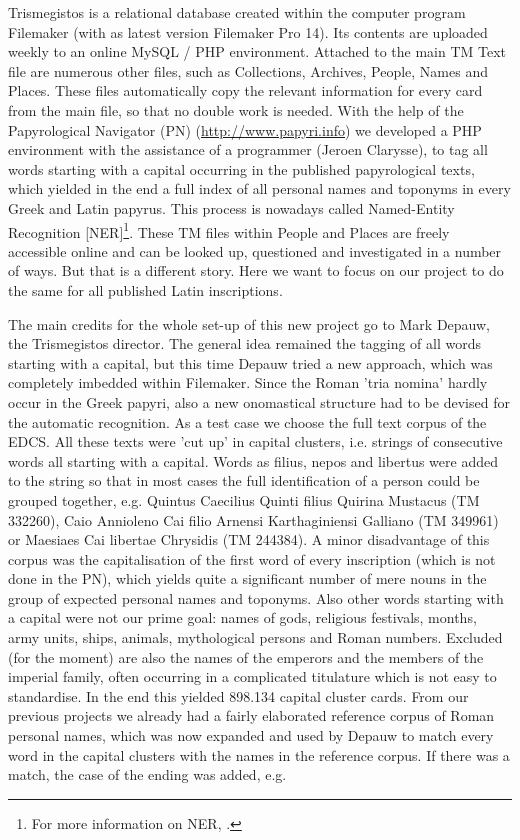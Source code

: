 \documentclass[amsthm,ebook]{saparticle}
\begin{document}
 Trismegistos is a relational database created within the computer program Filemaker (with as latest version
Filemaker Pro 14). Its contents are uploaded weekly to an online MySQL / PHP environment. Attached to the main TM Text
file are numerous other files, such as Collections, Archives, People, Names and Places. These files automatically copy
the relevant information for every card from the main file, so that no double work is needed. With the help of the
Papyrological Navigator (PN) (\url{http://www.papyri.info}) we developed a PHP environment with the assistance of a
programmer (Jeroen Clarysse), to tag all words starting with a capital occurring in the published papyrological texts,
which yielded in the end a full index of all personal names and toponyms in every Greek and Latin papyrus. This process
is nowadays called Named-Entity Recognition [NER]\footnote{ For more information on NER, \citet[304-313]{BrouxDepauw}.}. These
TM files within People and Places are freely accessible online and can be looked up, questioned and investigated in a
number of ways. But that is a different story. Here we want to focus on our project to do the same for all published
Latin inscriptions.


 The main credits for the whole set-up of this new project go to Mark Depauw, the Trismegistos director. The general
idea remained the tagging of all words starting with a capital, but this time Depauw tried a new approach, which was
completely imbedded within Filemaker. Since the Roman 'tria nomina' hardly occur in the Greek papyri, also a new
onomastical structure had to be devised for the automatic recognition. As a test case we choose the full text corpus of
the EDCS. All these texts were 'cut up' in capital clusters, i.e. strings of consecutive words all starting with a
capital. Words as filius, nepos and libertus were added to the string so that in most cases the full identification of
a person could be grouped together, e.g. Quintus Caecilius Quinti filius Quirina Mustacus (TM 332260), Caio Annioleno
Cai filio Arnensi Karthaginiensi Galliano (TM 349961) or Maesiaes Cai libertae Chrysidis (TM 244384). A minor
disadvantage of this corpus was the capitalisation of the first word of every inscription (which is not done in the
PN), which yields quite a significant number of mere nouns in the group of expected personal names and toponyms. Also
other words starting with a capital were not our prime goal: names of gods, religious festivals, months, army units,
ships, animals, mythological persons and Roman numbers. Excluded (for the moment) are also the names of the emperors
and the members of the imperial family, often occurring in a complicated titulature which is not easy to standardise.
In the end this yielded 898.134 capital cluster cards. From our previous projects we already had a fairly elaborated
reference corpus of Roman personal names, which was now expanded and used by Depauw to match every word in the capital
clusters with the names in the reference corpus. If there was a match, the case of the ending was added, e.g.
\end{document}
